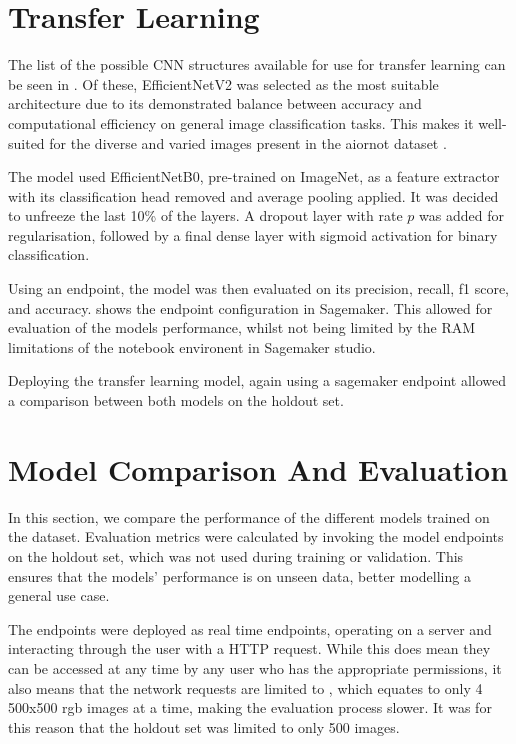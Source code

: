 \begin{figure}[h]
        
\end{figure}


\section{Transfer Learning}

The list of the possible CNN structures available for use for transfer learning can be seen in \cite{keras_applications}. Of these, EfficientNetV2 was selected as the most suitable architecture due to its demonstrated balance between accuracy and computational efficiency on general image classification tasks. This makes it well-suited for the diverse and varied images present in the aiornot dataset \cite{keras_applications, tan2021efficientnetv2}.

The model used EfficientNetB0, pre-trained on ImageNet, as a feature extractor with its classification head removed and average pooling applied. It was decided to unfreeze the last 10\% of the layers. A dropout layer with rate $p$ was added for regularisation, followed by a final dense layer with sigmoid activation for binary classification.


Using an endpoint, the model was then evaluated on its precision, recall, f1 score, and accuracy.  shows the endpoint configuration in Sagemaker. This allowed for evaluation of the models performance, whilst not being limited by the RAM limitations of the notebook environent in Sagemaker studio. 

Deploying the transfer learning model, again using a sagemaker endpoint allowed a comparison between both models on the holdout set.

\section{Model Comparison And Evaluation}

In this section, we compare the performance of the different models trained on the dataset. Evaluation metrics were calculated by invoking the model endpoints on the holdout set, which was not used during training or validation. This ensures that the models' performance is on unseen data, better modelling a general use case.

The endpoints were deployed as real time endpoints, operating on a server and interacting through the user with a HTTP request. While this does mean they can be accessed at any time by any user who has the appropriate permissions, it also means that the network requests are limited to , which equates to only 4 500x500 rgb images at a time, making the evaluation process slower. It was for this reason that the holdout set was limited to only 500 images.

